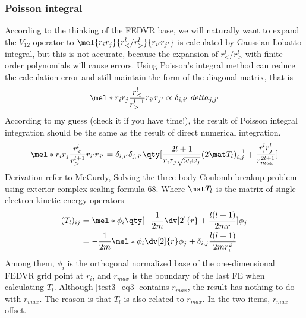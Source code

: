 \subsubsection{Poisson integral}
According to the thinking of the FEDVR base, we will naturally want to expand the $V_{12}$ operator to $\mel{r_i r_j}{r_<^l/r_>^l}{r_{i'} r_{j '}}$ is calculated by Gaussian Lobatto integral, but this is not accurate, because the expansion of $r_<^l/r_>^l$ with finite-order polynomials will cause errors. Using Poisson's integral method can reduce the calculation error and still maintain the form of the diagonal matrix, that is
\begin{equation}
\mel*{r_i r_j}{\frac{r_<^l}{r_>^{l+1}}}{r_{i'} r_{j'}} \propto \delta_{i,i'} \ delta_{j,j'}
\end{equation}
According to my guess (check it if you have time!), the result of Poisson integral integration should be the same as the result of direct numerical integration.
\begin{equation}\label{test3_eq3}
\mel*{r_i r_j}{\frac{r_<^l}{r_>^{l+1}}}{r_{i'} r_{j'}} = \delta_{i,i'} \delta_ {j,j'} \qty[\frac{2l+1}{r_i r_j \sqrt{\omega_i \omega_j}} (2\mat T_l)^{-1}_{i,j} + \frac{r_i ^l r_j^l}{r_{max}^{2l+1}}]
\end{equation}
Derivation refer to McCurdy, Solving the three-body Coulomb breakup problem using exterior complex scaling formula 68. Where $\mat T_l$ is the matrix of single electron kinetic energy operators
\begin{equation}
\begin{aligned}
(T_l)_{ij} &= \mel*{\phi_i}{\qty[-\frac{1}{2m}\dv[2]{r} + \frac{l(l+1)}{2mr }]}{\phi_j}\\
&= -\frac{1}{2m} \mel*{\phi_i}{\dv[2]{r}}{\phi_j} + \delta_{i,j}\frac{l(l+1)} {2mr_i^2}
\end{aligned}
\end{equation}
Among them, $\phi_i$ is the orthogonal normalized base  of the one-dimensional FEDVR grid point at $r_i$, and $r_{max}$ is the boundary of the last FE when calculating $T_l$. Although \autoref{test3_eq3} contains $r_{max}$, the result has nothing to do with $r_{max}$. The reason is that $T_l$ is also related to $r_{max}$. In the two items, $r_{max }$ offset.

